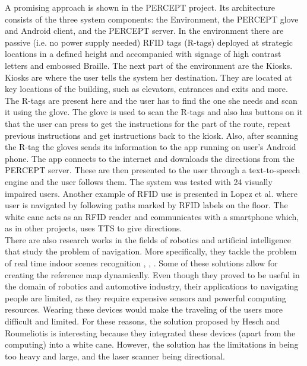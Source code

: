 A promising approach is shown in the PERCEPT \cite{percept} project. Its architecture consists of the three system components: the Environment, the PERCEPT glove and Android client, and
the PERCEPT server. In the environment there are passive (i.e. no power supply needed) RFID tags (R-tags) deployed at strategic locations in a defined height and accompanied with signage of high contrast letters and embossed Braille. The next part of the environment are the Kiosks. Kiosks are where the user tells the system her destination. They are located at key locations of the building, such as elevators, entrances and exits and more. The R-tags are present here and the user has to find the one she needs and scan it using the glove.
The glove is used to scan the R-tags and also has buttons on it that the user can press to get the instructions for the part of the route, repeat previous instructions and get instructions back to the kiosk. Also, after scanning the R-tag the gloves sends its information to the app running on user's Android phone. The app connects to the internet and downloads the directions from the PERCEPT server. These are then presented to the user through a text-to-speech engine and the user follows them. The system was tested with 24 visually impaired users.
Another example of RFID use is presented in Lopez et al. \cite{lopez} where user is navigated by following paths marked by RFID labels on the floor. The white cane acts as an RFID reader and communicates with a smartphone which, as in other projects, uses TTS to give directions.
\\

There are also research works in the fields of robotics and artificial intelligence that study the problem of navigation. More specifically, they tackle the problem of real time indoor scenes recognition \cite{espinace}, \cite{quattoni}, \cite{bosch}. Some of these solutions allow for creating the reference map dynamically. Even though they proved to be useful in the domain of robotics and automotive industry, their applications to navigating people are limited, as they require expensive sensors and powerful computing resources. Wearing these devices would make the traveling of the users more difficult and limited. For these reasons, the solution proposed by Hesch and Roumeliotis \cite{hesch} is interesting because they integrated these devices (apart from the computing) into a white cane. However, the solution has the limitations in being too heavy and large, and the laser scanner being directional.



